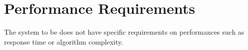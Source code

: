 \documentclass[../../RASD.tex]{subfiles}
\begin{document}
\section{Performance Requirements}
The system to be does not have specific requirements on performances such as response time or algorithm complexity.
\end{document}
